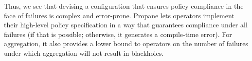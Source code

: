 \documentclass[10pt]{sigalternate052015} %
\newcommand{\todo}[1]{\textcolor{red}{[TODO: #1]}}
\newcommand{\sysname}{{\small \sf Propane}\xspace}
\begin{document}
Thus, we see that devising a configuration that ensures policy compliance in the face of failures is complex and error-prone. \sysname lets operators implement their high-level policy specification in a way that guarantees compliance under all failures (if that is possible; otherwise, it generates a compile-time error). For aggregation, it also provides a lower bound to operators on the number of failures under which aggregation will not result in blackholes.



%
%
%
%
\end{document}

